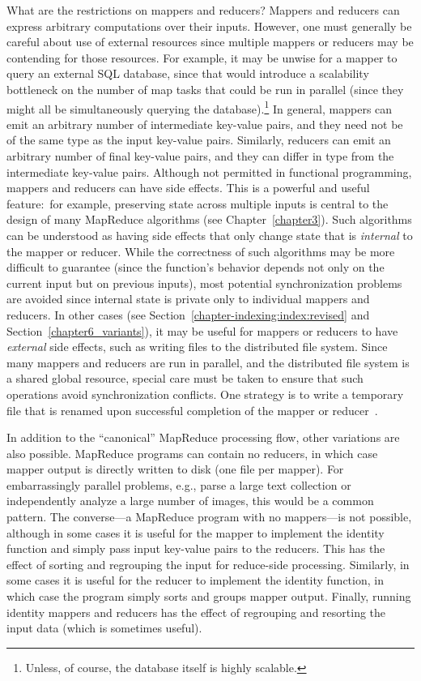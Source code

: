 What are the restrictions on mappers and reducers?  Mappers and
reducers can express arbitrary computations over their inputs.
However, one must generally be careful about use of external resources
since multiple mappers or reducers may be contending for those
resources.  For example, it may be unwise for a mapper to query an
external SQL database, since that would introduce a scalability
bottleneck on the number of map tasks that could be run in parallel
(since they might all be simultaneously querying the
database).\footnote{Unless, of course, the database itself is highly
scalable.} In general, mappers can emit an arbitrary number of
intermediate key-value pairs, and they need not be of the same type as
the input key-value pairs.  Similarly, reducers can emit an arbitrary
number of final key-value pairs, and they can differ in type from the
intermediate key-value pairs.  Although not permitted in functional
programming, mappers and reducers can have side effects.  This is a
powerful and useful feature:\ for example, preserving state across
multiple inputs is central to the design of many MapReduce algorithms
(see Chapter~\ref{chapter3}).  Such algorithms can be understood as
having side effects that only change state that is \emph{internal} to
the mapper or reducer.  While the correctness of such algorithms may
be more difficult to guarantee (since the function's behavior depends
not only on the current input but on previous inputs), most potential
synchronization problems are avoided since internal state is private
only to individual mappers and reducers.  In other cases (see
Section~\ref{chapter-indexing:index:revised} and
Section~\ref{chapter6_variants}), it may be useful for mappers or
reducers to have \emph{external} side effects, such as writing files
to the distributed file system.  Since many mappers and reducers are
run in parallel, and the distributed file system is a shared global
resource, special care must be taken to ensure that such operations
avoid synchronization conflicts.  One strategy is to write a temporary
file that is renamed upon successful completion of the mapper or
reducer~\cite{Dean_Ghemawat_OSDI2004}.

In addition to the ``canonical'' MapReduce processing flow, other
variations are also possible.  MapReduce programs can contain no
reducers, in which case mapper output is directly written to disk (one
file per mapper).  For embarrassingly parallel problems, e.g., parse a
large text collection or independently analyze a large number of
images, this would be a common pattern.  The converse---a MapReduce
program with no mappers---is not possible, although in some cases it
is useful for the mapper to implement the identity function and simply
pass input key-value pairs to the reducers.  This has the effect of
sorting and regrouping the input for reduce-side processing.
Similarly, in some cases it is useful for the reducer to implement the
identity function, in which case the program simply sorts and groups
mapper output.  Finally, running identity mappers and reducers has the
effect of regrouping and resorting the input data (which is sometimes
useful).

